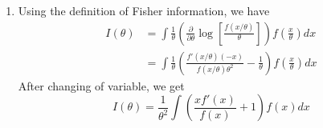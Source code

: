 \documentclass{article}
\begin{document}
\courseheader
{}

\begin{enumerate}

    \item Using the definition of Fisher information, we have
    \begin{align*}
        I(\theta) &= \int \frac{1}{\theta} \left(\frac{\partial}{\partial \theta} \log[\frac{f(x/\theta)}{\theta}]\right)f(\frac{x}{\theta})dx \\
        &= \int \frac{1}{\theta} \left( \frac{f'(x/\theta)(-x)}{f(x/\theta)\theta^2}-\frac{1}{\theta}\right)f(\frac{x}{\theta})dx 
    \end{align*}
    After changing of variable, we get
    $$
    I(\theta)= \frac{1}{\theta^2}\int  \left( \frac{xf'(x)}{f(x)}+1\right)f(x)dx 
    $$


\end{enumerate}
\end{document}
